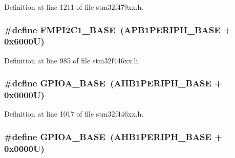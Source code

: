 Definition at line 1211 of file stm32f479xx.\+h.

\subsubsection[{\texorpdfstring{F\+M\+P\+I2\+C1\+\_\+\+B\+A\+SE}{FMPI2C1_BASE}}]{\setlength{\rightskip}{0pt plus 5cm}\#define F\+M\+P\+I2\+C1\+\_\+\+B\+A\+SE~({\bf A\+P\+B1\+P\+E\+R\+I\+P\+H\+\_\+\+B\+A\+SE} + 0x6000\+U)}\hypertarget{group___peripheral__memory__map_gac6e36f905b89086de0fceda4325a9a8e}{}\label{group___peripheral__memory__map_gac6e36f905b89086de0fceda4325a9a8e}


Definition at line 985 of file stm32f446xx.\+h.

\subsubsection[{\texorpdfstring{G\+P\+I\+O\+A\+\_\+\+B\+A\+SE}{GPIOA_BASE}}]{\setlength{\rightskip}{0pt plus 5cm}\#define G\+P\+I\+O\+A\+\_\+\+B\+A\+SE~({\bf A\+H\+B1\+P\+E\+R\+I\+P\+H\+\_\+\+B\+A\+SE} + 0x0000\+U)}\hypertarget{group___peripheral__memory__map_gad7723846cc5db8e43a44d78cf21f6efa}{}\label{group___peripheral__memory__map_gad7723846cc5db8e43a44d78cf21f6efa}


Definition at line 1017 of file stm32f446xx.\+h.

\subsubsection[{\texorpdfstring{G\+P\+I\+O\+A\+\_\+\+B\+A\+SE}{GPIOA_BASE}}]{\setlength{\rightskip}{0pt plus 5cm}\#define G\+P\+I\+O\+A\+\_\+\+B\+A\+SE~({\bf A\+H\+B1\+P\+E\+R\+I\+P\+H\+\_\+\+B\+A\+SE} + 0x0000\+U)}\hypertarget{group___peripheral__memory__map_gad7723846cc5db8e43a44d78cf21f6efa}{}\label{group___peripheral__memory__map_gad7723846cc5db8e43a44d78cf21f6efa}


